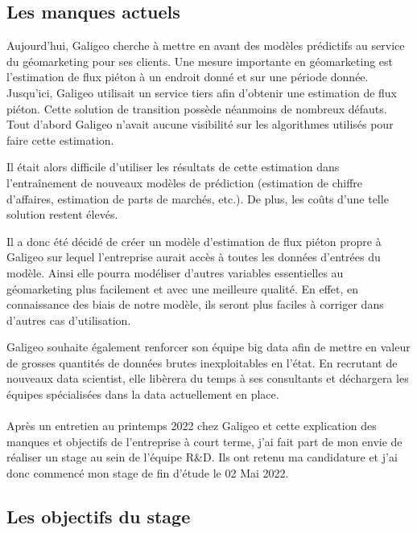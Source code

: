 \subsection{Les manques actuels}

Aujourd’hui, Galigeo cherche à mettre en avant des modèles prédictifs au service du géomarketing pour ses clients. Une mesure importante en géomarketing est l’estimation de flux piéton à un endroit donné et sur une période donnée. Jusqu’ici, Galigeo utilisait un service tiers afin d’obtenir une estimation de flux piéton. Cette solution de transition possède néanmoins de nombreux défauts. Tout d’abord Galigeo n’avait aucune visibilité sur les algorithmes utilisés pour faire cette estimation.

Il était alors difficile d’utiliser les résultats de cette estimation dans l’entraînement de nouveaux modèles de prédiction (estimation de chiffre d’affaires, estimation de parts de marchés, etc.). De plus, les coûts d’une telle solution restent élevés.

Il a donc été décidé de créer un modèle d’estimation de flux piéton propre à Galigeo sur lequel l’entreprise aurait accès à toutes les données d’entrées du modèle. Ainsi elle pourra modéliser d’autres variables essentielles au géomarketing plus facilement et avec une meilleure qualité. En effet, en connaissance des biais de notre modèle, ils seront plus faciles à corriger dans d’autres cas d’utilisation.

Galigeo souhaite également renforcer son équipe big data afin de mettre en valeur de grosses quantités de données brutes inexploitables en l’état. En recrutant de nouveaux data scientist, elle libèrera du temps à ses consultants et déchargera les équipes spécialisées dans la data actuellement en place.

\paragraph*{}

Après un entretien au printemps 2022 chez Galigeo et cette explication des manques et objectifs de l’entreprise à court terme, j’ai fait part de mon envie de réaliser un stage au sein de l’équipe R\&D. Ils ont retenu ma candidature et j’ai donc commencé mon stage de fin d’étude le 02 Mai 2022.


\subsection{Les objectifs du stage}


